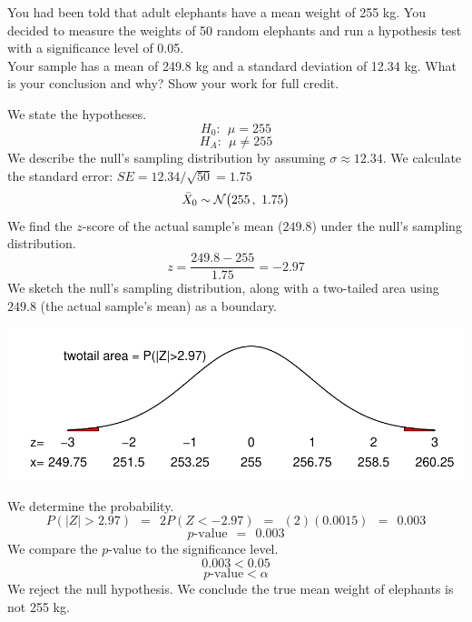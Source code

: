 \documentclass[12pt,letterpaper,addpoints]{exam}
\begin{document}
\begin{questions}
\question[10] You had been told that adult elephants have a mean weight of 255 kg. You decided to measure the weights of 50 random elephants and run a hypothesis test with a significance level of 0.05.
\\
Your sample has a mean of 249.8 kg and a standard deviation of 12.34 kg. What is your conclusion and why? Show your work for full credit.
\begin{solution}
We state the hypotheses.
$$H_0: ~~\mu=255 $$
$$H_A: ~~\mu\ne 255 $$
We describe the null's sampling distribution by assuming $\sigma \approx 12.34$. We calculate the standard error: $SE = 12.34/\sqrt{50} = 1.75$
$$\bar{X}_0 \sim \mathcal{N}\big(255\,,~1.75\big) $$
We find the $z$-score of the actual sample's mean ($249.8$) under the null's sampling distribution.
$$z = \frac{249.8-255}{1.75} = -2.97 $$
We sketch the null's sampling distribution, along with a two-tailed area using $249.8$ (the actual sample's mean) as a boundary.
\begin{center}
\includegraphics[scale=0.8]{figures/sketch4.pdf}
\end{center}
We determine the probability.
$$P(|Z|>2.97) ~~=~~ 2 P(Z<-2.97) ~~=~~ (2)(0.0015) ~~=~~ 0.003$$
$$p\text{-value} ~~=~~ 0.003 $$
We compare the $p$-value to the significance level.
$$0.003 < 0.05 $$
$$p\text{-value} < \alpha $$
We reject the null hypothesis. We conclude the true mean weight of elephants is not 255 kg.
\end{solution}

\end{questions}
\end{document}
